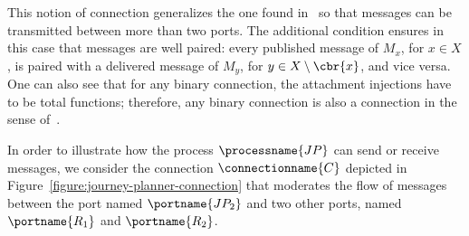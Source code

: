 \documentclass{LMCS}
\begin{document}
  \noindent This notion of connection generalizes the one found in~\cite{Fiadeiro-Lopes:An-interface-theory-for-service-oriented-design-2013} so that messages can be transmitted between more than two ports.
  The additional condition ensures in this case that messages are well paired: every published message of \(M_{x}\), for \(x \in X\), is paired with a delivered message of \(M_{y}\), for \(y \in X \setminus \cbr{x}\), and vice versa.
  One can also see that for any binary connection, the attachment injections have to be total functions; therefore, any binary connection is also a connection in the sense of~\cite{Fiadeiro-Lopes:An-interface-theory-for-service-oriented-design-2013}.

  \begin{exa}
    \label{example:journey-planner-connection}
    In order to illustrate how the process \(\processname{JP}\) can send or receive messages, we consider the connection \(\connectionname{C}\) depicted in Figure~\ref{figure:journey-planner-connection} that moderates the flow of messages between the port named \(\portname{JP_{2}}\) and two other ports, named \(\portname{R_{1}}\) and \(\portname{R_{2}}\).

    \begin{figure}[h]
      \centering

\end{figure}
\end{exa}
\end{document}
